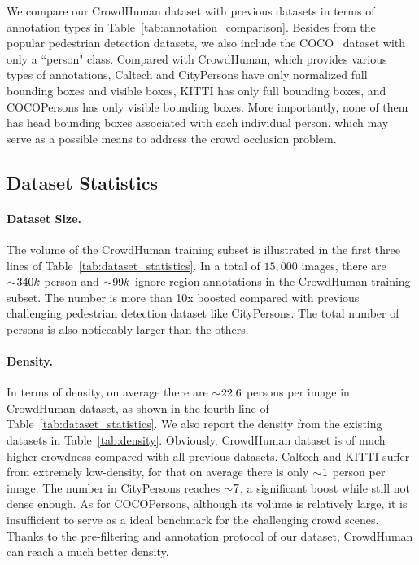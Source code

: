 \documentclass[10pt,twocolumn,letterpaper]{article}
\begin{document}
We compare our CrowdHuman dataset with previous datasets in terms of annotation types in Table~\ref{tab:annotation_comparison}. Besides from the popular pedestrian detection datasets, we also include the COCO~\cite{lin2014microsoft} dataset with only a ``person" class. Compared with CrowdHuman, which provides various types of annotations, Caltech and CityPersons have only normalized full bounding boxes and visible boxes, KITTI has only full bounding boxes, and COCOPersons has only visible bounding boxes. More importantly, none of them has head bounding boxes associated with each individual person, which may serve as a possible means to address the crowd occlusion problem.
 


\subsection{Dataset Statistics}
\label{sec:dataset_statistics}
\paragraph{Dataset Size.}
The volume of the CrowdHuman training subset is illustrated in the first three lines of Table~\ref{tab:dataset_statistics}. In a total of $15,000$ images, there are $\sim\negmedspace 340k$ person and $\sim\negmedspace 99k$ ignore region annotations in the CrowdHuman training subset. The number is more than 10x boosted compared with previous challenging pedestrian detection dataset like CityPersons. The total number of persons is also noticeably larger than the others. 

\paragraph{Density.}
In terms of density, on average there are $\sim\negmedspace 22.6$ persons per image in CrowdHuman dataset, as shown in the fourth line of Table~\ref{tab:dataset_statistics}. We also report the density from the existing datasets in Table~\ref{tab:density}. Obviously, CrowdHuman dataset is of much higher crowdness compared with all previous datasets. Caltech and KITTI suffer from extremely low-density, for that on average there is only $\sim\negmedspace 1$ person per image. The number in CityPersons reaches $\sim\negmedspace 7$, a significant boost while still not dense enough. As for COCOPersons, although its volume is relatively large, it is insufficient to serve as a ideal benchmark for the challenging crowd scenes. Thanks to the pre-filtering and annotation protocol of our dataset, CrowdHuman can reach a much better density.
\end{document}
